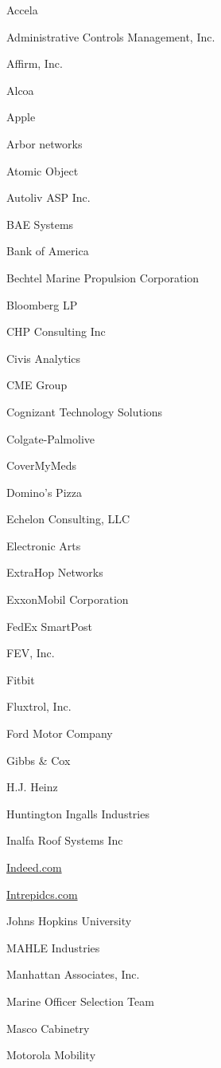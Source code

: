 \documentclass[twoside]{article}
\begin{document}
\begin{center}
\begin{multicols}{5}
\begin{FlushLeft}
        \begin{compactitem}
        \item Accela
\item Administrative Controls Management, Inc.
\item Affirm, Inc.
\item Alcoa
\item Apple
\item Arbor networks
\item Atomic Object
\item Autoliv ASP Inc.
\item BAE Systems
\item Bank of America
\item Bechtel Marine Propulsion Corporation
\item Bloomberg LP
\item CHP Consulting Inc
\item Civis Analytics
\item CME Group
\item Cognizant Technology Solutions
\item Colgate-Palmolive
\item CoverMyMeds
\item Domino's Pizza
\item Echelon Consulting, LLC
\item Electronic Arts
\item ExtraHop Networks
\item ExxonMobil Corporation
\item FedEx SmartPost
\item FEV, Inc.
\item Fitbit
\item Fluxtrol, Inc.
\item Ford Motor Company
\item Gibbs \& Cox
\item H.J. Heinz
\item Huntington Ingalls Industries
\item Inalfa Roof Systems Inc
\item \url{Indeed.com}
\item \url{Intrepidcs.com}
\item Johns Hopkins University
\item MAHLE Industries
\item Manhattan Associates, Inc.
\item Marine Officer Selection Team
\item Masco Cabinetry
\item Motorola Mobility

\end{compactitem}
\end{FlushLeft}
\end{multicols}
\end{center}
\end{document}
